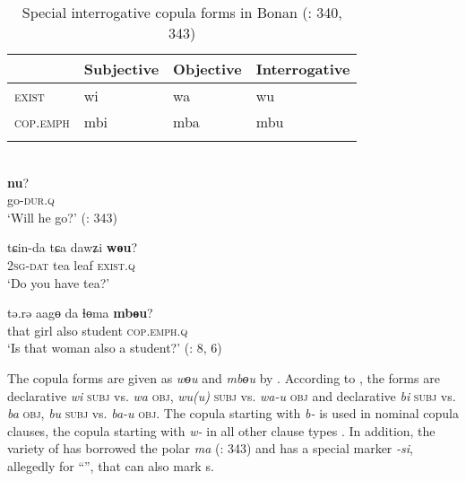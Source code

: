 \begin{table}
\caption{Special interrogative copula forms in Bonan (\citealt{WuHugjiltu2003}: 340, 343)}
\label{tab:mong:4}

\begin{tabularx}{\textwidth}{XXXl}
\lsptoprule
& \textbf{Subjective} & \textbf{Objective} & \textbf{Interrogative}\\
\midrule
\textsc{exist} & wi & wa & wu\\
\textsc{cop}.\textsc{emph} & mbi & mba & mbu\\
\lspbottomrule
\end{tabularx}
\end{table}

\ea%
    \label{ex:mong:40}
    \\
    \ea
    \textbf{{nu}}?\\
    go-\textsc{dur}.\textsc{q}\\
    \glt ‘Will he go?’ (\citealt{WuHugjiltu2003}: 343)
    
    \ex
    \gll tɕin-da    tɕa {dawʑi} \textbf{{w}}\textbf{{ɵ}}\textbf{{u}}?\\
    2\textsc{sg}-\textsc{dat} tea  leaf  \textsc{exist}.\textsc{q}\\
    \glt ‘Do you have tea?’
    
    \ex
    \gll tə.rə  aagɵ  da  ɬɵma \textbf{{mbɵ}}\textbf{{u}}?\\
    that  girl  also  student  \textsc{cop}.\textsc{emph}.\textsc{q}\\
    \glt ‘Is that woman also a student?’ (\citealt{Chaolu1994e}: 8, 6)
    \z
    \z 

The copula forms are given as \textit{wɵ}\textit{u} and \textit{mbɵu} by \citet{Chaolu1994e}. According to \citet[260]{Fried2010}, the forms are declarative \textit{wi} \textsc{subj} vs. \textit{wa} \textsc{obj},  \textit{wu(u)} \textsc{subj} vs. \textit{wa-u} \textsc{obj} and declarative \textit{bi} \textsc{subj} vs. \textit{ba} \textsc{obj},  \textit{bu} \textsc{subj} vs. \textit{ba-u} \textsc{obj}. The copula starting with \textit{b-} is used in nominal copula clauses, the copula starting with \textit{w-} in all other clause types \citep[260]{Fried2010}. In addition, the  variety of  has borrowed the  polar  \textit{ma}  (\citealt{WuHugjiltu2003}: 343) and has a special marker \textit{-si}, allegedly for “”, that can also mark s.


